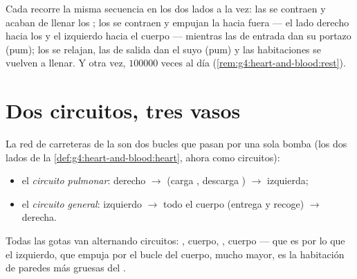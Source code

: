\begin{proposition}\label{prop:g7:heart-and-circulation:beat}
Cada  recorre la misma secuencia en los dos lados a la vez: las
 se contraen y acaban de llenar los ; los
 se contraen y empujan la  hacia fuera --- el lado
derecho hacia los  y el izquierdo hacia el cuerpo --- mientras
las  de entrada dan su portazo (pum); los  se
relajan, las  de salida dan el suyo (pum) y las habitaciones
se vuelven a llenar. Y otra vez, $100000$ veces al día
(\cref{rem:g4:heart-and-blood:rest}).
\end{proposition}
\admitted

\section{Dos circuitos, tres vasos}

\begin{definition}\label{def:g7:heart-and-circulation:double}
La red de carreteras de la  son dos bucles que pasan por una sola
bomba (los dos lados de la
\cref{def:g4:heart-and-blood:heart}, ahora como circuitos):
\begin{itemize}
  \item el \emph{circuito pulmonar}:  derecho $\rightarrow$
         (carga , descarga )
        $\rightarrow$  izquierda;
  \item el \emph{circuito general}:  izquierdo $\rightarrow$
        todo el cuerpo (entrega y recoge) $\rightarrow$ 
        derecha.
\end{itemize}
Todas las gotas van alternando circuitos: , cuerpo, ,
cuerpo --- que es por lo que el  izquierdo, que empuja por el
bucle del cuerpo, mucho mayor, es la habitación de paredes más gruesas
del .
\end{definition}

